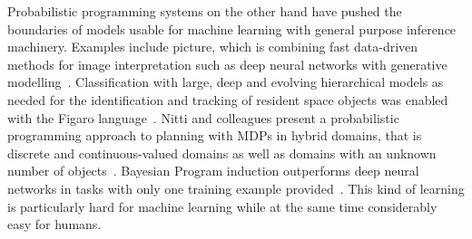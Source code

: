 Probabilistic programming systems on the other hand have pushed the boundaries
of models usable for machine learning with general purpose inference machinery.
Examples include picture, which is combining fast data-driven methods for image
interpretation such as deep neural networks with generative
modelling~\citep{kulkarni2015picture}. Classification with large, deep and evolving hierarchical
models as needed for the identification and tracking of resident space objects
was enabled with the Figaro language~\citep{ruttenberg2014hierarchical}.
Nitti and colleagues present a probabilistic programming approach to
planning with \ac{MDP}s in hybrid domains, that is discrete and continuous-valued
domains as well as domains with an unknown number of
objects~\citep{nitti2015planning}. Bayesian Program
induction outperforms deep neural networks in tasks with only one training example provided~\citep{lake2015humanlevel}. This kind of learning is
particularly hard for machine learning while at the same time considerably easy
for humans. 

